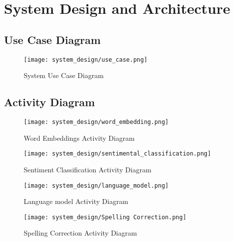 \chapter{System Design and Architecture}
\section{Use Case Diagram}
\begin{figure}[H]
    \centering
    \texttt{[image: system\_design/use\_case.png]}
    \caption{System Use Case Diagram}
    \label{fig:System Use Case Diagram}
\end{figure}

\section{Activity Diagram}
\begin{figure}[H]
    \centering
    \texttt{[image: system\_design/word\_embedding.png]}
    \caption{Word Embeddings Activity Diagram}
    \label{fig:Word Embeddings Activity Diagram}
\end{figure}

\begin{figure}[H]
    \centering
    \texttt{[image: system\_design/sentimental\_classification.png]}
    \caption{Sentiment Classification Activity Diagram}
    \label{fig:Sentiment Classification Activity Diagram}
\end{figure}

\begin{figure}[H]
    \centering
    \texttt{[image: system\_design/language\_model.png]}
    \caption{Language model Activity Diagram}
    \label{fig:Language model Activity Diagram}
\end{figure}

\begin{figure}[H]
    \centering
    \texttt{[image: system\_design/Spelling Correction.png]}
    \caption{Spelling Correction Activity Diagram}
    \label{fig:Spelling Correction Activity Diagram}
\end{figure}